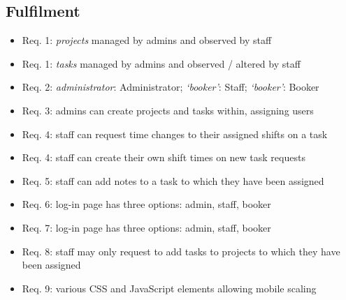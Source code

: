 \documentclass[10pt, english, aspectratio=169]{beamer}
\begin{document}
\newpage

	\subsection{Fulfilment}

	\begin{itemize}
	\setlength\itemsep{0cm}
		\item Req. 1: \textit{projects} managed by admins and observed by staff
		\item Req. 1: \textit{tasks} managed by admins and observed / altered by staff
		\item Req. 2: \textit{administrator}: Administrator; \textit{`booker'}: Staff; \textit{`booker'}: Booker
		\item Req. 3: admins can create projects and tasks within, assigning users
		\item Req. 4: staff can request time changes to their assigned shifts on a task 
		\item Req. 4: staff can create their own shift times on new task requests
		\item Req. 5: staff can add notes to a task to which they have been assigned
		\item Req. 6: log-in page has three options: admin, staff, booker
		\item Req. 7: log-in page has three options: admin, staff, booker
		\item Req. 8: staff may only request to add tasks to projects to which they have been assigned
		\item Req. 9: various CSS and JavaScript elements allowing mobile scaling
	\end{itemize}
\end{document}
